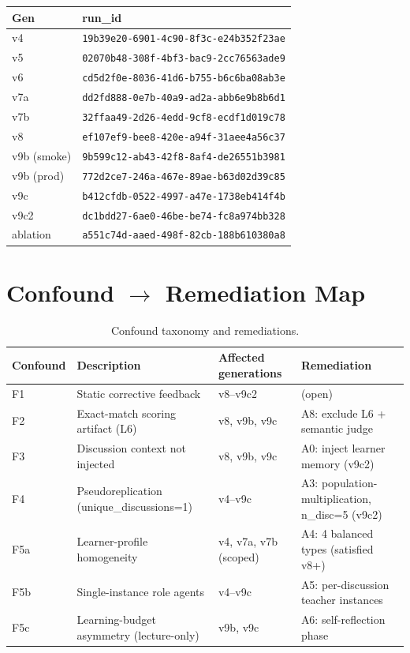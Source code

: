 \documentclass[11pt]{article}
\begin{document}
\begin{center}
\begin{tabular}{ll}
\toprule
Gen & run\_id \\
\midrule
v4 & \texttt{19b39e20-6901-4c90-8f3c-e24b352f23ae} \\
v5 & \texttt{02070b48-308f-4bf3-bac9-2cc76563ade9} \\
v6 & \texttt{cd5d2f0e-8036-41d6-b755-b6c6ba08ab3e} \\
v7a & \texttt{dd2fd888-0e7b-40a9-ad2a-abb6e9b8b6d1} \\
v7b & \texttt{32ffaa49-2d26-4edd-9cf8-ecdf1d019c78} \\
v8 & \texttt{ef107ef9-bee8-420e-a94f-31aee4a56c37} \\
v9b (smoke) & \texttt{9b599c12-ab43-42f8-8af4-de26551b3981} \\
v9b (prod) & \texttt{772d2ce7-246a-467e-89ae-b63d02d39c85} \\
v9c & \texttt{b412cfdb-0522-4997-a47e-1738eb414f4b} \\
v9c2 & \texttt{dc1bdd27-6ae0-46be-be74-fc8a974bb328} \\
ablation & \texttt{a551c74d-aaed-498f-82cb-188b610380a8} \\
\bottomrule
\end{tabular}
\end{center}

\section{Confound $\to$ Remediation Map}
\label{appendix:confounds}

\begin{table}[h]
\centering
\caption{Confound taxonomy and remediations.}
\label{tab:confound-map}
\begin{tabular}{@{}lp{4.1cm}p{3.1cm}p{5.1cm}@{}}
\toprule
Confound & Description & Affected generations & Remediation \\
\midrule
F1  & Static corrective feedback           & v8--v9c2        & (open) \\
F2  & Exact-match scoring artifact (L6)    & v8, v9b, v9c    & A8: exclude L6 + semantic judge \\
F3  & Discussion context not injected      & v8, v9b, v9c & A0: inject learner memory (v9c2) \\
F4  & Pseudoreplication (unique\_discussions=1) & v4--v9c & A3: population-multiplication, n\_disc=5 (v9c2) \\
F5a & Learner-profile homogeneity          & v4, v7a, v7b (scoped) & A4: 4 balanced types (satisfied v8+) \\
F5b & Single-instance role agents          & v4--v9c         & A5: per-discussion teacher instances \\
F5c & Learning-budget asymmetry (lecture-only) & v9b, v9c   & A6: self-reflection phase \\
\bottomrule
\end{tabular}
\end{table}
\end{document}
